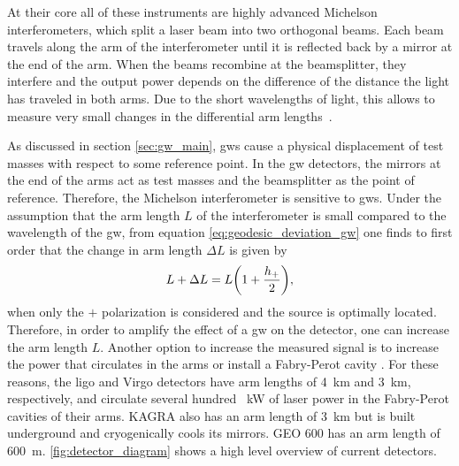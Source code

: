 At their core all of these instruments are highly advanced Michelson interferometers, which split a laser beam into two orthogonal beams. Each beam travels along the arm of the interferometer until it is reflected back by a mirror at the end of the arm. When the beams recombine at the beamsplitter, they interfere and the output power depends on the difference of the distance the light has traveled in both arms. Due to the short wavelengths of light, this allows to measure very small changes in the differential arm lengths~\cite{Demtroder:1995aaa}. %

As discussed in section \ref{sec:gw_main}, \acrshort{gw}s cause a physical displacement of test masses with respect to some reference point. In the \acrshort{gw} detectors, the mirrors at the end of the arms act as test masses and the beamsplitter as the point of reference. Therefore, the Michelson interferometer is sensitive to \acrshort{gw}s. Under the assumption that the arm length $L$ of the interferometer is small compared to the wavelength of the \acrshort{gw}, from equation \eqref{eq:geodesic_deviation_gw} one finds to first order that the change in arm length $\Delta L$ is given by
\begin{equation}
L + \Delta L = L {\left( 1 + \frac{h_+}{2} \right)},
\end{equation}
when only the $+$ polarization is considered and the source is optimally located. Therefore, in order to amplify the effect of a \acrshort{gw} on the detector, one can increase the arm length $L$. Another option to increase the measured signal is to increase the power that circulates in the arms or install a Fabry-Perot cavity \cite{Maggiore:2008aaa}. For these reasons, the \acrshort{ligo} and Virgo detectors have arm lengths of \SI{4}{\kilo\metre} and \SI{3}{\kilo\metre}, respectively, and circulate several hundred \SI{}{\kilo\watt} of laser power in the Fabry-Perot cavities of their arms. KAGRA also has an arm length of \SI{3}{\kilo\metre} but is built underground and cryogenically cools its mirrors. GEO 600 has an arm length of \SI{600}{\metre}. \autoref{fig:detector_diagram} shows a high level overview of current detectors.

